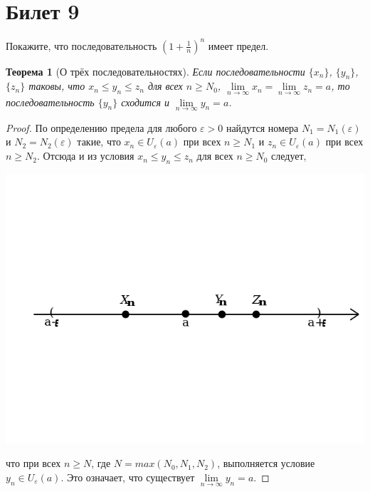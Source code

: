 \documentclass[a4paper,12pt]{article}
\newtheorem*{ther}{Теорема}
\newcommand{\eps}{\varepsilon}
\begin{document}
    \section*{Билет 9}

    Покажите, что последовательность $(1 + \frac{1}{n})^n$ имеет предел.

    \begin{ther}[О трёх последовательностях]
        Если последовательности 
        $\{ x_{n}\}$, $ \{ y_{n} \} $, $ \{ z_{n} \}$
        таковы, что  $x_{n} \leq y_{n} \leq z_{n}$ для всех 
        $n \geq N_{0}$,  $\lim\limits_{n\to \infty }x_{n}=\lim\limits_{n\to \infty }z_{n}=a$, то последовательность  $ \{ y_{n} \}$ сходится и  $\lim\limits_{n\to \infty }y_{n}=a$.
    \end{ther}

    \begin{proof}
        По определению предела для любого $\eps > 0$ найдутся номера $N_{1}=N_{1}(\eps)$ и  $N_{2}=N_{2}(\eps)$ такие, что  $x_{n}\in U_{\eps }(a)$ при всех  $n\geq N_{1}$ и  $z_{n}\in U_{\eps }(a)$ при всех  $n\geq N_{2}$. Отсюда и из условия $x_{n}\leq y_{n}\leq z_{n}$ для всех  $n \geq N_{0}$  следует,
        \begin{center}\includegraphics[scale=0.4]{1.png}\end{center}
        что при всех  $n\geq N$,  где $N = max \left ( N_{0},N_{1},N_{2} \right )$, выполняется условие  $y_{n}\in U_{\varepsilon }(a)$. Это означает, что существует  $\lim\limits_{n\rightarrow \infty }y_{n}=a$.
    \end{proof}
\end{document}

